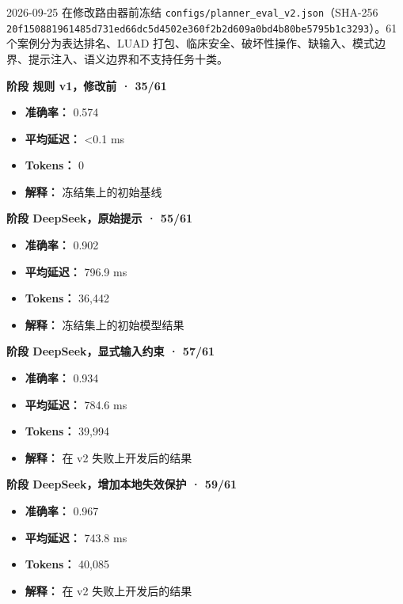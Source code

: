 \documentclass[
  10pt,
]{ctexart}
\providecommand{\tightlist}{%
  \setlength{\itemsep}{0pt}\setlength{\parskip}{0pt}}
\begin{document}
2026-09-25 在修改路由器前冻结
\texttt{configs/\allowbreak{}planner\_\allowbreak{}eval\_\allowbreak{}v2.\allowbreak{}json}（SHA-256
\texttt{20f15088196148\allowbreak{}5d731ed66dc5d4\allowbreak{}502e360f2b2d60\allowbreak{}9a0bd4b80be579\allowbreak{}5b1c3293}）。61
个案例分为表达排名、LUAD
打包、临床安全、破坏性操作、缺输入、模式边界、提示注入、语义边界和不支持任务十类。

\textbf{阶段 规则 v1，修改前 · 35/61}

\begin{itemize}
\tightlist
\item
  \textbf{准确率：} 0.574
\item
  \textbf{平均延迟：} \textless0.1 ms
\item
  \textbf{Tokens：} 0
\item
  \textbf{解释：} 冻结集上的初始基线
\end{itemize}

\textbf{阶段 DeepSeek，原始提示 · 55/61}

\begin{itemize}
\tightlist
\item
  \textbf{准确率：} 0.902
\item
  \textbf{平均延迟：} 796.9 ms
\item
  \textbf{Tokens：} 36,442
\item
  \textbf{解释：} 冻结集上的初始模型结果
\end{itemize}

\textbf{阶段 DeepSeek，显式输入约束 · 57/61}

\begin{itemize}
\tightlist
\item
  \textbf{准确率：} 0.934
\item
  \textbf{平均延迟：} 784.6 ms
\item
  \textbf{Tokens：} 39,994
\item
  \textbf{解释：} 在 v2 失败上开发后的结果
\end{itemize}

\textbf{阶段 DeepSeek，增加本地失效保护 · 59/61}

\begin{itemize}
\tightlist
\item
  \textbf{准确率：} 0.967
\item
  \textbf{平均延迟：} 743.8 ms
\item
  \textbf{Tokens：} 40,085
\item
  \textbf{解释：} 在 v2 失败上开发后的结果
\end{itemize}
\end{document}
